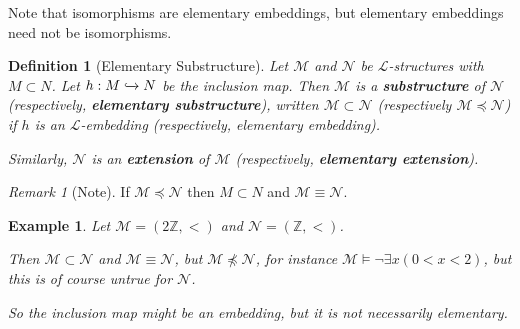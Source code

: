 \documentclass[]{article}
\theoremstyle{custhm}
\theoremstyle{cusdef}
\newtheorem{defin}[theorem]{Definition}
\theoremstyle{custhm}
\theoremstyle{custhm}
\theoremstyle{custhm}
\theoremstyle{ex}
\newtheorem{ex}[theorem]{Example}
\theoremstyle{custhm}
\theoremstyle{cusdef}
\theoremstyle{remark}
\newtheorem*{remark*}{Remark}
\newcommand{\Z}{\mathbb{Z}}
\newcommand{\undf}[1]{\textit{\textbf{#1}}}
\renewcommand{\L}{\mathcal{L}}
\newcommand{\M}{\mathcal{M}}
\newcommand{\N}{\mathcal{N}}
\begin{document}
Note that isomorphisms are elementary embeddings, but elementary embeddings need not be isomorphisms.

\begin{defin}[Elementary Substructure]
Let $\M$ and $\N$ be $\L$-structures with $M\subset N$. Let $h:M \xhookrightarrow{} N$ be the inclusion map. Then $\M$ is a \undf{substructure} of $\N$ (respectively, \undf{elementary substructure}), written $\M\subset \N$ (respectively $\M\preceq\N$) if $h$ is an $\L$-embedding (respectively, elementary embedding).

Similarly, $\N$ is an \undf{extension} of $\M$ (respectively, \undf{elementary extension}).
\end{defin}	

\begin{remark*}[Note]
If $\M\preceq\N$ then $M\subset N$ and $\M\equiv \N$.
\end{remark*}
\begin{ex}
Let $\M = (2\Z, <)$ and $\N = (\Z, <)$.

Then $\M \subset \N$ and $\M \equiv \N$, but $\M\not\preceq\N$, for instance $\M\models \neg\exists x(0 < x < 2)$, but this is of course untrue for $\N$.

So the inclusion map might be an embedding, but it is not necessarily elementary.
\end{ex}
\end{document}
